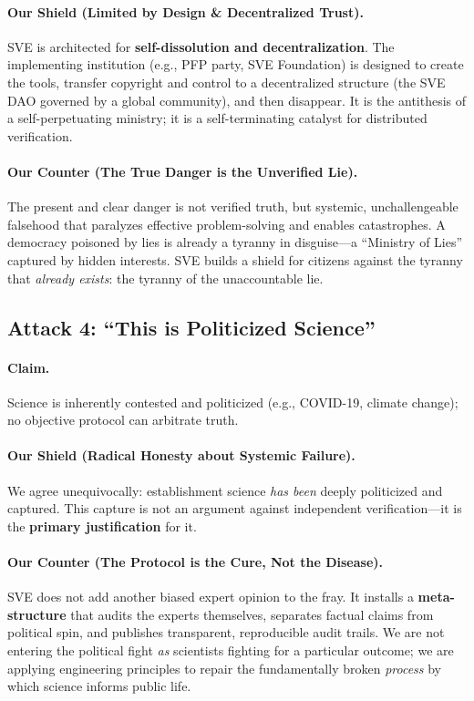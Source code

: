 \documentclass[11pt,a4paper]{article}
\begin{document}
\begin{small}
\paragraph{\textbf{Our Shield (Limited by Design \& Decentralized Trust).}} SVE is architected for \textbf{self-dissolution and decentralization}. The implementing institution (e.g., PFP party, SVE Foundation) is designed to create the tools, transfer copyright and control to a decentralized structure (the SVE DAO governed by a global community), and then disappear. It is the antithesis of a self-perpetuating ministry; it is a self-terminating catalyst for distributed verification.

\paragraph{\textbf{Our Counter (The True Danger is the Unverified Lie).}} The present and clear danger is not verified truth, but systemic, unchallengeable falsehood that paralyzes effective problem-solving and enables catastrophes. A democracy poisoned by lies is already a tyranny in disguise—a ``Ministry of Lies'' captured by hidden interests. SVE builds a shield for citizens against the tyranny that \textit{already exists}: the tyranny of the unaccountable lie.

\vspace{1em}

\subsection*{\textcolor{accentcolor}{Attack 4: ``This is Politicized Science''}}

\paragraph{\textbf{Claim.}} Science is inherently contested and politicized (e.g., COVID-19, climate change); no objective protocol can arbitrate truth.

\paragraph{\textbf{Our Shield (Radical Honesty about Systemic Failure).}} We agree unequivocally: establishment science \textit{has been} deeply politicized and captured. This capture is not an argument against independent verification—it is the \textbf{primary justification} for it.

\paragraph{\textbf{Our Counter (The Protocol is the Cure, Not the Disease).}} SVE does not add another biased expert opinion to the fray. It installs a \textbf{meta-structure} that audits the experts themselves, separates factual claims from political spin, and publishes transparent, reproducible audit trails. We are not entering the political fight \textit{as} scientists fighting for a particular outcome; we are applying engineering principles to repair the fundamentally broken \textit{process} by which science informs public life.


\end{small}
\end{document}
